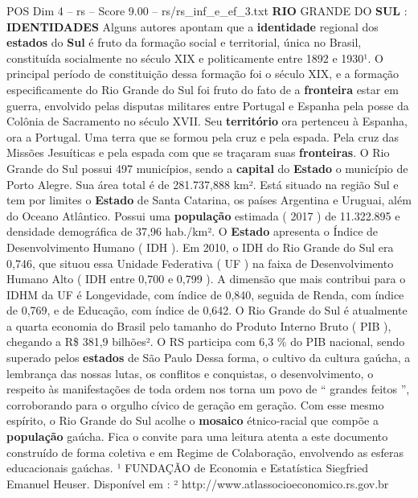 \begin{textsample}{POS Dim 4 – rs – Score 9.00 – rs/rs\_inf\_e\_ef\_3.txt}  \label{ex:f4_pos_094}
\textbf{RIO} GRANDE DO \textbf{SUL} : \textbf{IDENTIDADES} Alguns autores apontam que a \textbf{identidade} regional dos \textbf{estados} do \textbf{Sul} é fruto da formação social e territorial, única no Brasil, constituída socialmente no século XIX e politicamente entre 1892 e 1930¹.
O principal período de constituição dessa formação foi o século XIX, e a formação especificamente do Rio Grande do Sul foi fruto do fato de a \textbf{fronteira} estar em guerra, envolvido pelas disputas militares entre Portugal e Espanha pela posse da Colônia de Sacramento no século XVII.
Seu \textbf{território} ora pertenceu à Espanha, ora a Portugal.
Uma terra que se formou pela cruz e pela espada.
Pela cruz das Missões Jesuíticas e pela espada com que se traçaram suas \textbf{fronteiras}.
O Rio Grande do Sul possui 497 municípios, sendo a \textbf{capital} do \textbf{Estado} o município de Porto Alegre.
Sua área total é de 281.737,888 km².
Está situado na região Sul e tem por limites o \textbf{Estado} de Santa Catarina, os países Argentina e Uruguai, além do Oceano Atlântico.
Possui uma \textbf{população} estimada ( 2017 ) de 11.322.895 e densidade demográfica de 37,96 hab./km².
O \textbf{Estado} apresenta o Índice de Desenvolvimento Humano ( IDH ).
Em 2010, o IDH do Rio Grande do Sul era 0,746, que situou essa Unidade Federativa ( UF ) na faixa de Desenvolvimento Humano Alto ( IDH entre 0,700 e 0,799 ).
A dimensão que mais contribui para o IDHM da UF é Longevidade, com índice de 0,840, seguida de Renda, com índice de 0,769, e de Educação, com índice de 0,642.
O Rio Grande do Sul é atualmente a quarta economia do Brasil pelo tamanho do Produto Interno Bruto ( PIB ), chegando a R\$ 381,9 bilhões².
O RS participa com 6,3 \% do PIB nacional, sendo superado pelos \textbf{estados} de São Paulo Dessa forma, o cultivo da cultura gaúcha, a lembrança das nossas lutas, os conflitos e conquistas, o desenvolvimento, o respeito às manifestações de toda ordem nos torna um povo de “ grandes feitos ”, corroborando para o orgulho cívico de geração em geração.
Com esse mesmo espírito, o Rio Grande do Sul acolhe o \textbf{mosaico} étnico-racial que compõe a \textbf{população} gaúcha.
Fica o convite para uma leitura atenta a este documento construído de forma coletiva e em Regime de Colaboração, envolvendo as esferas educacionais gaúchas. ¹ FUNDAÇÃO de Economia e Estatística Siegfried Emanuel Heuser.
Disponível em : ² http://www.atlassocioeconomico.rs.gov.br

\end{textsample}
